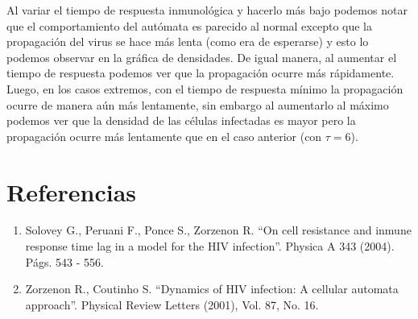 \documentclass[12pt,letterpaper,oneside]{report}
\begin{document}
	Al variar el tiempo de respuesta inmunológica y hacerlo más bajo podemos notar que el comportamiento del autómata es parecido al normal excepto que la propagación del virus se hace más lenta (como era de esperarse) y esto lo podemos observar en la gráfica de densidades. De igual manera, al aumentar el tiempo de respuesta podemos ver que la propagación ocurre más rápidamente. Luego, en los casos extremos, con el tiempo de respuesta mínimo la propagación ocurre de manera aún más lentamente, sin embargo al aumentarlo al máximo podemos ver que la densidad de las células infectadas es mayor pero la propagación ocurre más lentamente que en el caso anterior (con $\tau = 6$).\\

	


    \begingroup
	\renewcommand{\cleardoublepage}{}
	\renewcommand{\clearpage}{}
	\chapter{Referencias}
	\begin{enumerate}
		\item Solovey G., Peruani F., Ponce S., Zorzenon R. ``On cell resistance and inmune response time lag in a model for the HIV infection''. Physica A 343 (2004). Págs. 543 - 556.\\
		\item Zorzenon R., Coutinho S. ``Dynamics of HIV infection: A cellular automata approach''. Physical Review Letters (2001), Vol. 87, No. 16.
	\end{enumerate}
	\endgroup
\end{document}
